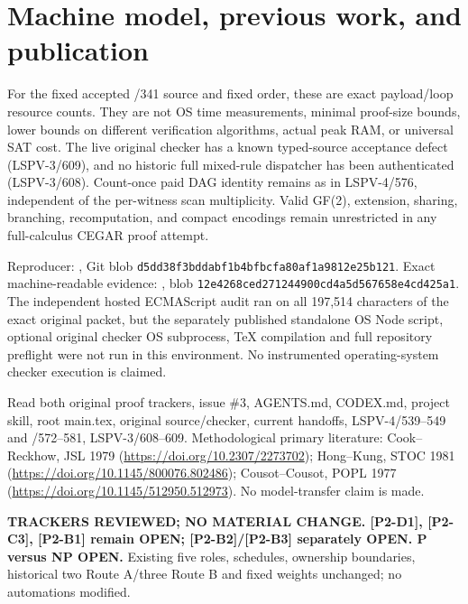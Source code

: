 \documentclass[11pt]{article}
\begin{document}
\section*{Machine model, previous work, and publication}
For the fixed accepted /341 source and fixed order, these are exact payload/loop resource counts. They are not OS time measurements, minimal proof-size bounds, lower bounds on different verification algorithms, actual peak RAM, or universal SAT cost. The live original checker has a known typed-source acceptance defect (LSPV-3/609), and no historic full mixed-rule dispatcher has been authenticated (LSPV-3/608). Count-once paid DAG identity remains as in LSPV-4/576, independent of the per-witness scan multiplicity. Valid GF(2), extension, sharing, branching, recomputation, and compact encodings remain unrestricted in any full-calculus CEGAR proof attempt.

Reproducer: , Git blob \texttt{d5dd38f3bddabf1b4bfbcfa80af1a9812e25b121}. Exact machine-readable evidence: , blob \texttt{12e4268ced271244900cd4a5d567658e4cd425a1}. The independent hosted ECMAScript audit ran on all 197,514 characters of the exact original packet, but the separately published standalone OS Node script, optional original checker OS subprocess, TeX compilation and full repository preflight were not run in this environment. No instrumented operating-system checker execution is claimed.

Read both original proof trackers, issue \#3, AGENTS.md, CODEX.md, project skill, root main.tex, original source/checker, current handoffs, LSPV-4/539--549 and /572--581, LSPV-3/608--609. Methodological primary literature: Cook--Reckhow, JSL 1979 (\url{https://doi.org/10.2307/2273702}); Hong--Kung, STOC 1981 (\url{https://doi.org/10.1145/800076.802486}); Cousot--Cousot, POPL 1977 (\url{https://doi.org/10.1145/512950.512973}). No model-transfer claim is made.

\textbf{TRACKERS REVIEWED; NO MATERIAL CHANGE. [P2-D1], [P2-C3], [P2-B1] remain OPEN; [P2-B2]/[P2-B3] separately OPEN. P versus NP OPEN.} Existing five roles, schedules, ownership boundaries, historical two Route A/three Route B and fixed weights unchanged; no automations modified.
\end{document}
